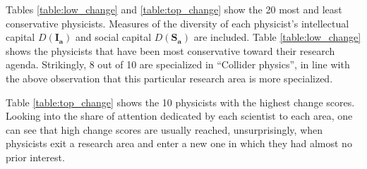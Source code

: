\documentclass{article}
\begin{document}
 Tables \ref{table:low_change} and \ref{table:top_change} show the 20 most and least conservative physicists. Measures of the diversity of each physicist's intellectual capital $D(\bm{I_a})$ and social capital $D(\bm{S_a})$ are included. Table \ref{table:low_change} shows the physicists that have been most conservative toward their research agenda. Strikingly, 8 out of 10 are specialized in ``Collider physics'', in line with the above observation that this particular research area is more specialized.

Table \ref{table:top_change} shows the 10 physicists with the highest change scores.  Looking into the share of attention dedicated by each scientist to each area, one can see that high change scores are usually reached, unsurprisingly, when physicists exit a research area and enter a new one in which they had almost no prior interest. 
\end{document}
